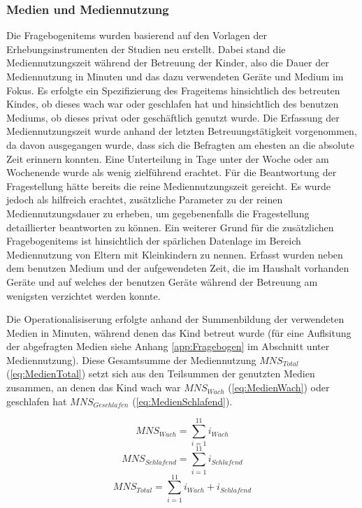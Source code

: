 \subsubsection{Medien und Mediennutzung}\label{sec:MedienMediennutzung}
Die Fragebogenitems wurden basierend auf den Vorlagen der Erhebungsinstrumenten der Studien  neu erstellt. Dabei stand die Mediennutzungszeit während der Betreuung der Kinder, also die Dauer der Mediennutzung in Minuten und das dazu verwendeten Geräte und Medium im Fokus. Es erfolgte ein Spezifizierung des Frageitems hinsichtlich des betreuten Kindes, ob dieses wach war oder geschlafen hat und hinsichtlich des benutzen Mediums, ob dieses privat oder geschäftlich genutzt wurde. Die Erfassung der Mediennutzungszeit wurde anhand der letzten Betreuungstätigkeit vorgenommen, da davon ausgegangen wurde, dass sich die Befragten am ehesten an die absolute Zeit erinnern konnten. Eine Unterteilung in Tage unter der Woche oder am Wochenende wurde als wenig zielführend erachtet. Für die Beantwortung der Fragestellung hätte bereits die reine Mediennutzungszeit gereicht. Es wurde jedoch als hilfreich erachtet, zusätzliche Parameter zu der reinen Mediennutzungsdauer zu erheben, um gegebenenfalls die Fragestellung detaillierter beantworten zu können. Ein weiterer Grund für die zusätzlichen Fragebogenitems ist hinsichtlich der spärlichen Datenlage im Bereich Mediennutzung von Eltern mit Kleinkindern zu nennen. Erfasst wurden neben dem benutzen Medium und der aufgewendeten Zeit, die im Haushalt vorhanden Geräte und auf welches der benutzen Geräte während der Betreuung am wenigsten verzichtet werden konnte. 

Die Operationalisiserung erfolgte anhand der Summenbildung der verwendeten Medien in Minuten, während denen das Kind betreut wurde (für eine Auflsitung der abgefragten Medien siehe Anhang \ref{app:Fragebogen} im Abschnitt  unter Mediennutzung). Diese Gesamtsumme der Mediennutzung $MNS_{Total}$ (\ref{eq:MedienTotal}) setzt sich aus den Teilsummen der genutzten  Medien zusammen, an denen das Kind wach war $MNS_{Wach}$ (\ref{eq:MedienWach}) oder geschlafen hat $MNS_{Geschlafen}$ (\ref{eq:MedienSchlafend}).  

\begin{equation}\label{eq:MedienWach}
    MNS_{Wach}=\sum_{i=1}^{11} i_{Wach}
\end{equation}
\begin{equation}\label{eq:MedienSchlafend}
    MNS_{Schlafend}=\sum_{i=1}^{11} i_{Schlafend}
\end{equation}
\begin{equation}\label{eq:MedienTotal}
    MNS_{Total}=\sum_{i=1}^{11} i_{Wach} + i_{Schlafend}
\end{equation}

